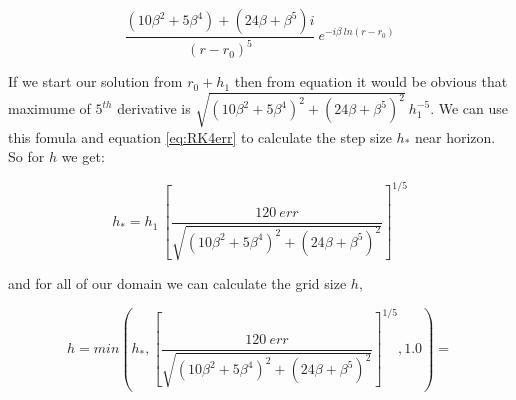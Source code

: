 \begin{equation} \label{eq:nearhorizon5thdervitaive}
    \frac{(10\beta^2+5\beta^4) + (24\beta+\beta^5)i}{(r-r_0)^5}~e^{-i\beta~ln(r-r_0)}
\end{equation}

If we start our solution from $r_0+h_1$ then from equation \label{eq:nearhorizon5thdervitaive} it would be obvious that maximume of $5^{th}$ derivative is $\sqrt{(10\beta^2+5\beta^4)^2 + (24\beta+\beta^5)^2}~h_1^{-5}$. We can use this fomula and equation \ref{eq:RK4err} to calculate the step size $h_*$ near horizon. So for $h$ we get:

\begin{equation}
    h_* = h_1~\left[\frac{120~err}{\sqrt{(10\beta^2+5\beta^4)^2 + (24\beta+\beta^5)^2}}\right]^{1/5}
\end{equation}

and for all of our domain we can calculate the grid size $h$,

\begin{equation}
    h = min(h_* , \left[\frac{120~err}{\sqrt{(10\beta^2+5\beta^4)^2 + (24\beta+\beta^5)^2}}\right]^{1/5} , 1.0) = 
\end{equation}
